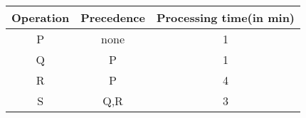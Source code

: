 \begin{center}
    \begin{tabular}{c c c}
    \hline
      {Operation}   & {Precedence} & {Processing time(in min)} \\ \hline
        P & none & 1 \\ \hline
        Q & P & 1\\ \hline
        R & P & 4 \\ \hline
        S & Q,R & 3 \\ \hline 
    \end{tabular}
\end{center}
